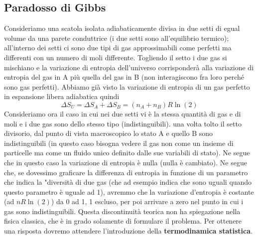 \documentclass[10pt,a4paper]{article}
\begin{document}
\subsection{Paradosso di Gibbs}
Consideriamo una scatola isolata adiabaticamente divisa in due setti di egual volume da una parete conduttrice (i due setti sono all'equilibrio termico); all'interno dei setti ci sono due tipi di gas approssimabili come perfetti ma differenti con un numero di moli differente. Togliendo il setto i due gas si mischiano e la variazione di entropia dell'universo corrisponderà alla variazione di entropia del gas in A più quella del gas in B (non interagiscono fra loro perché sono gas perfetti). Abbiamo già visto la variazione di entropia di un gas perfetto in espansione libera adiabatica quindi
\[\Delta S_U = \Delta S_A + \Delta S_B = (n_A + n_B)R\ln(2)\]
Consideriamo ora il caso in cui nei due setti vi è la stessa quantità di gas e di moli e i due gas sono dello stesso tipo (indistinguibili). una volta tolto il setto divisorio, dal punto di vista macroscopico lo stato A e quello B sono indistinguibili (in questo caso bisogna vedere il gas non come un insieme di particelle ma come un fluido unico definito dalle sue variabili di stato). Ne segue che in questo caso la variazione di entropia è nulla (nulla è cambiato). Ne segue che, se dovessimo graficare la differenza di entropia in funzione di un parametro che indica la "diversità di due gas (che ad esempio indica che sono uguali quando questo parametro è uguale ad 1), avremmo che la variazione d'entropia è costante (ad \(nR\ln(2)\)) da 0 ad 1, 1 escluso, per poi arrivare a zero nel punto in cui i gas sono indistinguibili. Questa discontinuità teorica non ha spiegazione nella fisica classica, che è in grado solamente di formulare il problema. Per ottenere una risposta dovremo attendere l'introduzione della \textbf{termodinamica statistica}.
\end{document}
